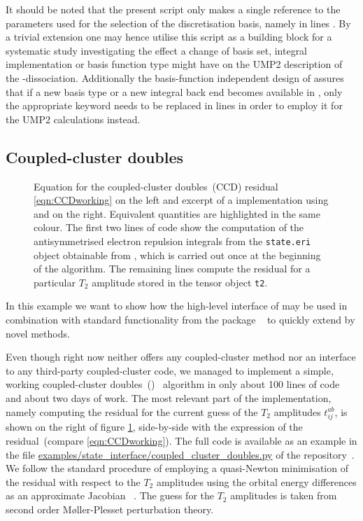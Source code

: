 It should be noted
that the present script only makes a single reference to the
parameters used for the selection of the discretisation basis,
namely in lines \ldict.
By a trivial extension one may hence utilise
this script as a building block for a systematic study
investigating the effect
a change of basis set, integral implementation or basis function type
might have on the UMP2 description of the -dissociation.
Additionally the basis-function independent design of \molsturm
assures that if a new basis type or a new integral back end
becomes available in \gint,
only the appropriate keyword needs to be replaced in lines \ldict
in order to employ it for the UMP2 calculations instead.

\subsection{Coupled-cluster doubles}
\label{sec:ex:ccd}

\begin{figure}
	
	\caption[Coupled-cluster doubles residual equation and implementation side-by-side]
	{Equation for the coupled-cluster doubles~(CCD)
		residual \eqref{eqn:CCDworking}
		on the left and excerpt of a \CCD implementation
		using \molsturm and \numpy on the right.
		Equivalent quantities are highlighted in the same colour.
		The first two lines of code show the computation of the
		antisymmetrised electron repulsion integrals
		from the \texttt{state.eri} object obtainable from \molsturm,
		which is carried out once at the beginning of the algorithm.
		The remaining lines compute the residual for
		a particular $T_2$ amplitude stored in the tensor object
		\texttt{t2}.
	}
	\label{fig:codeCCD}
\end{figure}

In this example we want to show how the
high-level \python interface of \molsturm may be used
in combination with standard functionality from the \python
package \numpy~\cite{Walt2011,scipyWeb} to quickly extend
\molsturm by novel methods.

Even though \molsturm right now neither offers
any coupled-cluster method nor
an interface to any third-party coupled-cluster code,
we managed to implement a simple, working
coupled-cluster doubles~(\CCD)~\cite{Hurley1976,Bartlett1978} algorithm
in only about 100 lines of code and about two days of work.
The most relevant part of the implementation,
namely computing the \CCD residual for the current guess
of the $T_2$ amplitudes $t_{ij}^{ab}$,
is shown on the right of figure \ref{fig:codeCCD},
side-by-side with the expression of the \CCD residual~(compare \eqref{eqn:CCDworking}).
The full \CCD code is available as an example
in the file \url{examples/state_interface/coupled_cluster_doubles.py}
of the \molsturm repository~\cite{molsturmWeb}.
We follow the standard procedure
of employing a quasi-Newton minimisation
of the \CCD residual with respect to the $T_2$ amplitudes
using the orbital energy differences as an approximate Jacobian%
~\cite{Bartlett1978,Helgaker2013}.
The guess for the $T_2$ amplitudes is taken
from second order Møller-Plesset perturbation theory.

